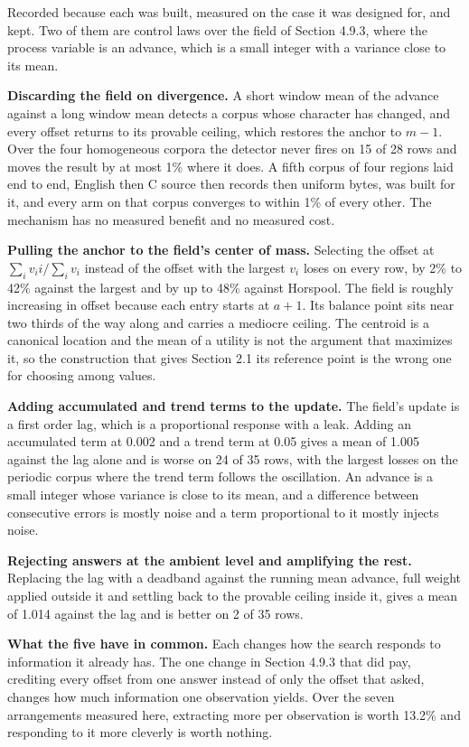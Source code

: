 Recorded because each was built, measured on the case it was designed for, and kept. Two of them are control laws over the field of Section 4.9.3, where the process variable is an advance, which is a small integer with a variance close to its mean.

\textbf{Discarding the field on divergence.} A short window mean of the advance against a long window mean detects a corpus whose character has changed, and every offset returns to its provable ceiling, which restores the anchor to \(m-1\). Over the four homogeneous corpora the detector never fires on 15 of 28 rows and moves the result by at most 1\% where it does. A fifth corpus of four regions laid end to end, English then C source then records then uniform bytes, was built for it, and every arm on that corpus converges to within 1\% of every other. The mechanism has no measured benefit and no measured cost.

\textbf{Pulling the anchor to the field's center of mass.} Selecting the offset at \(\sum_i v_i i / \sum_i v_i\) instead of the offset with the largest \(v_i\) loses on every row, by 2\% to 42\% against the largest and by up to 48\% against Horspool. The field is roughly increasing in offset because each entry starts at \(a+1\). Its balance point sits near two thirds of the way along and carries a mediocre ceiling. The centroid is a canonical location and the mean of a utility is not the argument that maximizes it, so the construction that gives Section 2.1 its reference point is the wrong one for choosing among values.

\textbf{Adding accumulated and trend terms to the update.} The field's update is a first order lag, which is a proportional response with a leak. Adding an accumulated term at 0.002 and a trend term at 0.05 gives a mean of 1.005 against the lag alone and is worse on 24 of 35 rows, with the largest losses on the periodic corpus where the trend term follows the oscillation. An advance is a small integer whose variance is close to its mean, and a difference between consecutive errors is mostly noise and a term proportional to it mostly injects noise.

\textbf{Rejecting answers at the ambient level and amplifying the rest.} Replacing the lag with a deadband against the running mean advance, full weight applied outside it and settling back to the provable ceiling inside it, gives a mean of 1.014 against the lag and is better on 2 of 35 rows.

\textbf{What the five have in common.} Each changes how the search responds to information it already has. The one change in Section 4.9.3 that did pay, crediting every offset from one answer instead of only the offset that asked, changes how much information one observation yields. Over the seven arrangements measured here, extracting more per observation is worth 13.2\% and responding to it more cleverly is worth nothing.

